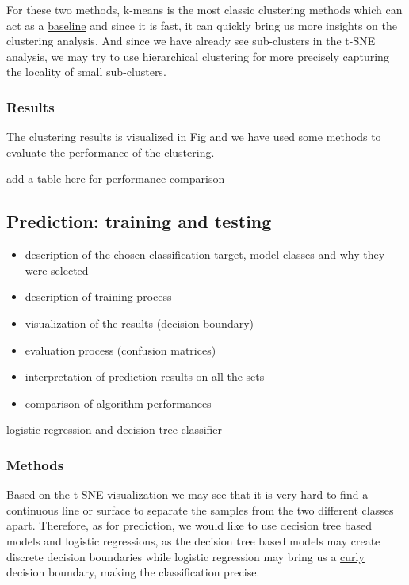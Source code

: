 \documentclass{article}
\begin{document}
For these two methods, k-means is the most classic clustering methods which can act as a \underline{baseline} and since it is fast, it can quickly bring us more insights on the clustering analysis. And since we have already see sub-clusters in the t-SNE analysis, we may try to use hierarchical clustering for more precisely capturing the locality of small sub-clusters.

\subsubsection*{Results}

The clustering results is visualized in \underline{Fig} and we have used some methods to evaluate the performance of the clustering.

\underline{add a table here for performance comparison}

\subsection{Prediction: training and testing}

\begin{itemize}
    \item description of the chosen classification target, model classes and why they were selected
    \item description of training process
    \item visualization of the results (decision boundary)
    \item evaluation process (confusion matrices)
    \item interpretation of prediction results on all the sets
    \item comparison of algorithm performances
\end{itemize}

\underline{logistic regression and decision tree classifier}

\subsubsection*{Methods}

Based on the t-SNE visualization we may see that it is very hard to find a continuous line or surface to separate the samples from the two different classes apart. 
Therefore, as for prediction, we would like to use decision tree based models and logistic regressions, as the decision tree based models may create discrete decision boundaries while logistic regression may bring us a \underline{curly} decision boundary, making the classification precise.
\end{document}
